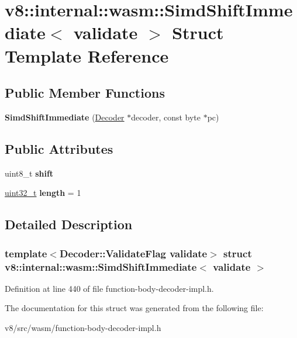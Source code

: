 \hypertarget{structv8_1_1internal_1_1wasm_1_1SimdShiftImmediate}{}\section{v8\+:\+:internal\+:\+:wasm\+:\+:Simd\+Shift\+Immediate$<$ validate $>$ Struct Template Reference}
\label{structv8_1_1internal_1_1wasm_1_1SimdShiftImmediate}
\subsection*{Public Member Functions}
\begin{DoxyCompactItemize}
\item 
\mbox{\label{structv8_1_1internal_1_1wasm_1_1SimdShiftImmediate_a9031941a5b557a7e883789b794f3142e}} 
{\bfseries Simd\+Shift\+Immediate} (\mbox{\hyperlink{classv8_1_1internal_1_1wasm_1_1Decoder}{Decoder}} $\ast$decoder, const byte $\ast$pc)
\end{DoxyCompactItemize}
\subsection*{Public Attributes}
\begin{DoxyCompactItemize}
\item 
\mbox{\label{structv8_1_1internal_1_1wasm_1_1SimdShiftImmediate_aeb77d3b2377fd9792695eccf449fbfa2}} 
uint8\+\_\+t {\bfseries shift}
\item 
\mbox{\label{structv8_1_1internal_1_1wasm_1_1SimdShiftImmediate_acff7a37c00c5d2f4f742efd574e4cced}} 
\mbox{\hyperlink{classuint32__t}{uint32\+\_\+t}} {\bfseries length} = 1
\end{DoxyCompactItemize}


\subsection{Detailed Description}
\subsubsection*{template$<$Decoder\+::\+Validate\+Flag validate$>$\newline
struct v8\+::internal\+::wasm\+::\+Simd\+Shift\+Immediate$<$ validate $>$}



Definition at line 440 of file function-\/body-\/decoder-\/impl.\+h.



The documentation for this struct was generated from the following file\+:\begin{DoxyCompactItemize}
\item 
v8/src/wasm/function-\/body-\/decoder-\/impl.\+h\end{DoxyCompactItemize}
